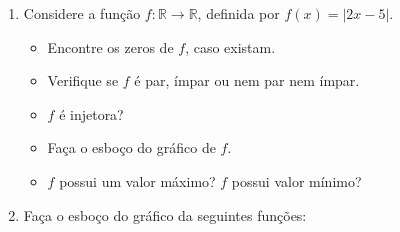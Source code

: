 \begin{enumerate}
\begin{minipage}[t]{.44\textwidth}
\begin{itemize}
\item[a)] $ \vert 5x-8\vert \leq 2$
\item[b)] $|2x-3| \geq 7$
\end{itemize}
\end{minipage}
\begin{minipage}[t]{.44\textwidth}
\begin{itemize}
\item[c)]$|x^2-9|+x \leq 3$
\item[d)] $|x-2|+ |x+8| \geq 2x+12$
\end{itemize}
\end{minipage}
\item Considere a função $f: \mathbb{R} \to \mathbb{R}$, definida por $f(x)= | 2x-5|$.
\begin{itemize}
\item[a)] Encontre os zeros de $f$, caso existam.
\item[b)] Verifique se $f$ é par, ímpar ou nem par nem ímpar.
\item[c)] $f$ é injetora?
\item[d)] Faça o esboço do gráfico de $f$.
\item[e)] $f$ possui um valor máximo? $f$ possui valor mínimo?
\end{itemize}

\item Faça o esboço do gráfico da seguintes funções:


\end{enumerate}
